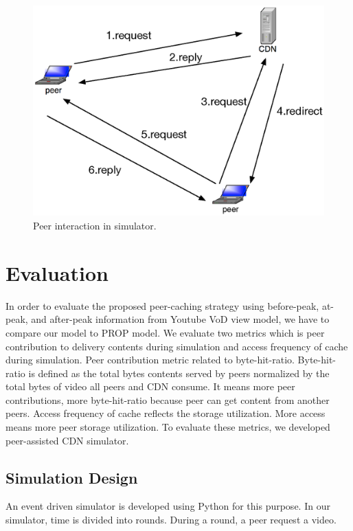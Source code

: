 \documentclass[10pt,final,journal,a4paper]{IEEEtran}
\begin{document}
\begin{figure}[!t]
\begin{center}
\includegraphics[scale=0.4]{graphs/p2p-system-description.eps}
\end{center}
\caption{Peer interaction in simulator.}
\label{fig:p2pcdninteractioninsimulator}
\end{figure} 



\section{Evaluation}\label{evaluation}

In order to evaluate the proposed peer-caching strategy using before-peak, at-peak, and after-peak information from Youtube VoD view model, we have to compare our model to PROP model.
We evaluate two metrics which is peer contribution to delivery contents during simulation and access frequency of cache during simulation.
Peer contribution metric related to byte-hit-ratio. 
Byte-hit-ratio is defined as the total bytes contents served by peers normalized by the total bytes of video all peers and CDN consume.
It means more peer contributions, more byte-hit-ratio because peer can get content from another peers. 
Access frequency of cache reflects the storage utilization. 
More access means more peer storage utilization.  
To evaluate these metrics, we developed peer-assisted CDN simulator. 

\subsection{Simulation Design}\label{simulationdesign}
An event driven simulator is developed using Python for this purpose.
In our simulator, time is divided into rounds. 
During a round, a peer request a video.
\end{document}
